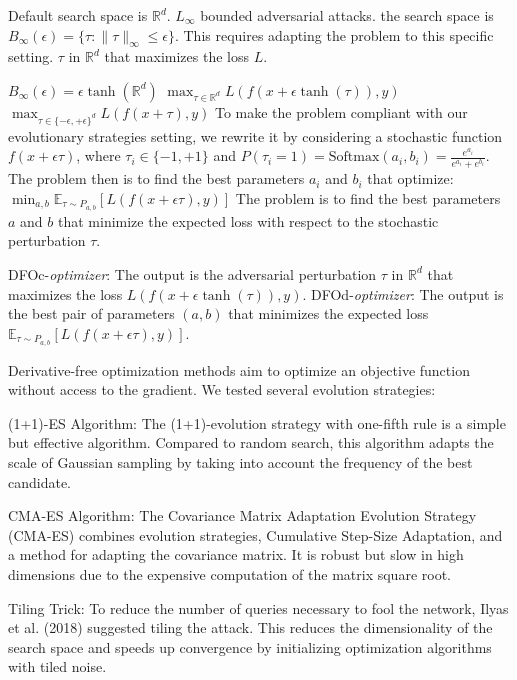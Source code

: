Default search space is $\mathbb{R}^d$.
$L_{\infty}$ bounded adversarial attacks. 
the search space is $B_{\infty}(\epsilon) = \{\tau : \|\tau\|_{\infty} \leq \epsilon\}$. This requires adapting the problem to this specific setting.
$\tau$ in $\mathbb{R}^d$ that maximizes the loss $L$.

$B_{\infty}(\epsilon) = \epsilon \tanh(\mathbb{R}^d) $
$\max_{\tau \in \mathbb{R}^d} L(f(x + \epsilon \tanh(\tau)), y)$
$\max_{\tau \in \{-\epsilon, +\epsilon\}^d} L(f(x + \tau), y)$
To make the problem compliant with our evolutionary strategies setting, we rewrite it by considering a stochastic function $f(x + \epsilon \tau)$, where $\tau_i \in \{-1, +1\}$ and $P(\tau_i = 1) = \text{Softmax}(a_i, b_i) = \frac{e^{a_i}}{e^{a_i} + e^{b_i}}$. The problem then is to find the best parameters $a_i$ and $b_i$ that optimize:
$\min_{a,b} \mathbb{E}_{\tau \sim P_{a,b}} [L(f(x + \epsilon \tau), y)]$
The problem is to find the best parameters $a$ and $b$ that minimize the expected loss with respect to the stochastic perturbation $\tau$.


DFOc-\textit{optimizer}: The output is the adversarial perturbation $\tau$ in $\mathbb{R}^d$ that maximizes the loss $L(f(x + \epsilon \tanh(\tau)), y)$.
DFOd-\textit{optimizer}: The output is the best pair of parameters $(a, b)$ that minimizes the expected loss $\mathbb{E}_{\tau \sim P_{a,b}} [L(f(x + \epsilon \tau), y)]$.


Derivative-free optimization methods aim to optimize an objective function without access to the gradient. We tested several evolution strategies:

{(1+1)-ES Algorithm}:
The (1+1)-evolution strategy with one-fifth rule is a simple but effective algorithm. Compared to random search, this algorithm adapts the scale of Gaussian sampling by taking into account the frequency of the best candidate.

{CMA-ES Algorithm}:
The Covariance Matrix Adaptation Evolution Strategy (CMA-ES) combines evolution strategies, Cumulative Step-Size Adaptation, and a method for adapting the covariance matrix. It is robust but slow in high dimensions due to the expensive computation of the matrix square root.

{Tiling Trick}:
To reduce the number of queries necessary to fool the network, Ilyas et al. (2018) suggested tiling the attack. This reduces the dimensionality of the search space and speeds up convergence by initializing optimization algorithms with tiled noise.

